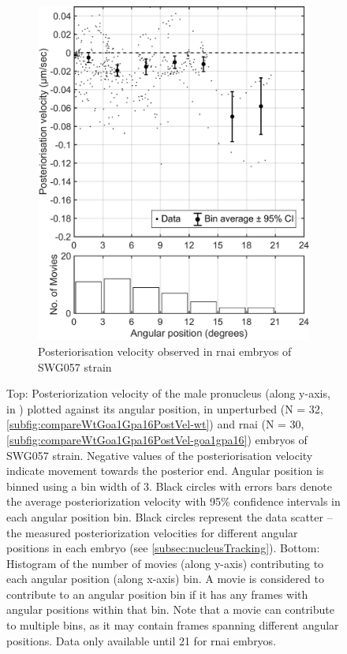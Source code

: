 \begin{figure}
\begin{subfigure}[t]{0.45\textwidth}
    \includegraphics[width=\textwidth]{Results/FigExpGoa1Gpa16/goa1gpa16PostVel.pdf}
    \caption{Posteriorisation velocity observed in  \ac{rnai} embryos of SWG057 strain} 
    \label{subfig:compareWtGoa1Gpa16PostVel-goa1gpa16}
\end{subfigure}
\caption[Comparing posteriorisation of male pronucleus between unperturbed and  \acs{rnai} embryos of SWG057 strain]{Top: Posteriorization velocity of the male pronucleus (along y-axis, in \si{\unitPostVel}) plotted against its angular position, in unperturbed (N = 32, \autoref{subfig:compareWtGoa1Gpa16PostVel-wt}) and  \ac{rnai} (N = 30,\autoref{subfig:compareWtGoa1Gpa16PostVel-goa1gpa16}) embryos of SWG057 strain. Negative values of the posteriorisation velocity indicate movement towards the posterior end. Angular position is binned using a bin width of \SI{3}{\unitAngle}. Black circles with errors bars denote the average posteriorization velocity with \num{95}\% confidence intervals in each angular position bin. Black circles represent the data scatter -- the measured posteriorization velocities for different angular positions in each embryo (see \autoref{subsec:nucleusTracking}). Bottom: Histogram of the number of movies (along y-axis) contributing to each angular position (along x-axis) bin. A movie is considered to contribute to an angular position bin if it has any frames with angular positions within that bin. Note that a movie can contribute to multiple bins, as it may contain frames spanning different angular positions. Data only available until \SI{21}{\unitAngle} for  \ac{rnai} embryos.}
\label{fig:compareWtGoa1Gpa16PostVel}
\end{figure}

